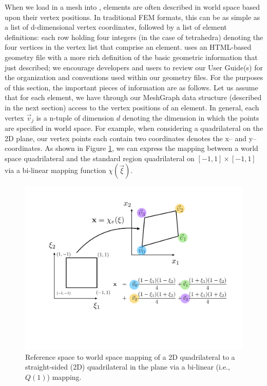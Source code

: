 When we load in a mesh into {\nek}, elements are often described in world space based upon their vertex positions.  In traditional FEM formats, this can be as
simple as a list of d-dimensional vertex coordinates, followed by a list of element definitions:  each row holding four integers (in the case of tetrahedra) denoting
the four vertices in the vertex list that comprise an element.   {\nek} uses an HTML-based geometry file with a more rich definition of the basic geometric
information that just described; we encourage developers and users to review our User Guide(s) for the organization and conventions used within our geometry 
files.  For the purposes of this section, the important pieces of information are as follows.  Let us assume that for each element, we have through our MeshGraph
data structure (described in the next section) access to the vertex positions of an element.   In general, each vertex $\vec{v}_j$ is a n-tuple of dimension $d$ denoting
the dimension in which the points are specified in world space.  For example, when considering a quadrilateral on the 2D plane, our vertex points each contain
two coordinates denotes the x-- and y--coordinates.  As shown in Figure \ref{spatialdomains:planarmap}, we can express the mapping between a world space
quadrilateral and the standard region quadrilateral on $[-1,1]\times[-1,1]$ via a bi-linear mapping function $\chi(\vec{\xi})$.

\begin{figure}[htb]
\centering
\includegraphics[width=6in]{img/planarmap.pdf}
\caption{Reference space to world space mapping of a 2D quadrilateral to a straight-sided (2D) quadrilateral in the plane via a bi-linear (i.e., $Q(1)$) mapping.}
\label{spatialdomains:planarmap}
\end{figure}

